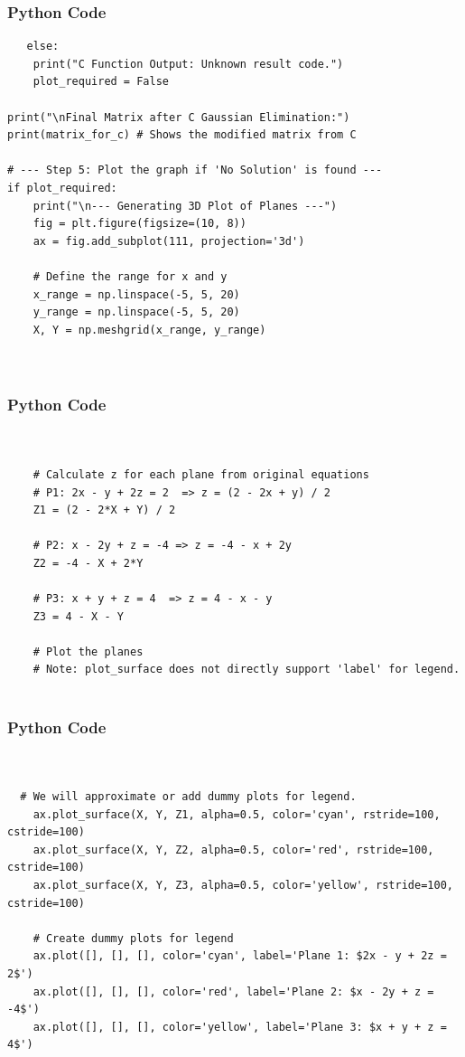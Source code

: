 \documentclass{beamer}
\begin{document}
      \begin{frame}[fragile]
        \frametitle{Python Code}
        \begin{lstlisting}
   else:
    print("C Function Output: Unknown result code.")
    plot_required = False

print("\nFinal Matrix after C Gaussian Elimination:")
print(matrix_for_c) # Shows the modified matrix from C

# --- Step 5: Plot the graph if 'No Solution' is found ---
if plot_required:
    print("\n--- Generating 3D Plot of Planes ---")
    fig = plt.figure(figsize=(10, 8))
    ax = fig.add_subplot(111, projection='3d')

    # Define the range for x and y
    x_range = np.linspace(-5, 5, 20)
    y_range = np.linspace(-5, 5, 20)
    X, Y = np.meshgrid(x_range, y_range)

   
        \end{lstlisting}
    \end{frame}

     \begin{frame}[fragile]
        \frametitle{Python Code}
        \begin{lstlisting}
  

    # Calculate z for each plane from original equations
    # P1: 2x - y + 2z = 2  => z = (2 - 2x + y) / 2
    Z1 = (2 - 2*X + Y) / 2
    
    # P2: x - 2y + z = -4 => z = -4 - x + 2y
    Z2 = -4 - X + 2*Y

    # P3: x + y + z = 4  => z = 4 - x - y
    Z3 = 4 - X - Y

    # Plot the planes
    # Note: plot_surface does not directly support 'label' for legend.
    
        \end{lstlisting}
    \end{frame}
    \begin{frame}[fragile]
        \frametitle{Python Code}
        \begin{lstlisting}
  

  # We will approximate or add dummy plots for legend.
    ax.plot_surface(X, Y, Z1, alpha=0.5, color='cyan', rstride=100, cstride=100)
    ax.plot_surface(X, Y, Z2, alpha=0.5, color='red', rstride=100, cstride=100)
    ax.plot_surface(X, Y, Z3, alpha=0.5, color='yellow', rstride=100, cstride=100)

    # Create dummy plots for legend
    ax.plot([], [], [], color='cyan', label='Plane 1: $2x - y + 2z = 2$')
    ax.plot([], [], [], color='red', label='Plane 2: $x - 2y + z = -4$')
    ax.plot([], [], [], color='yellow', label='Plane 3: $x + y + z = 4$')


    
        \end{lstlisting}
    \end{frame}
\end{document}
